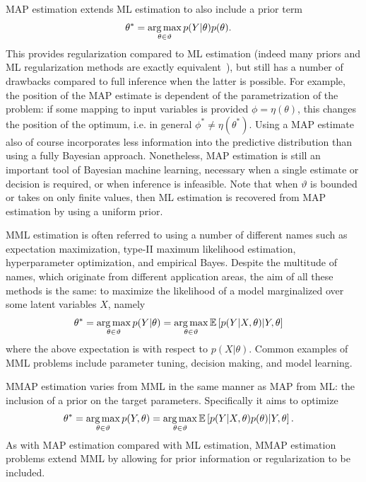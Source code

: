 MAP estimation extends ML estimation to also include a prior term
\begin{align}
\label{eq:opt:map}
\theta^* &= \operatorname*{arg\,max}_{\theta \in \vartheta} p(Y|\theta) p(\theta).	
\end{align}
This provides regularization compared to ML estimation (indeed many priors and
ML regularization methods are exactly equivalent~\cite{bishop2006pattern}),
but still has a number of drawbacks compared to full inference when the latter is
possible.  For example, the position of the MAP estimate is dependent of the
parametrization of the problem: if some mapping to input variables is
provided $\phi = \eta (\theta)$, this changes the position of the optimum, i.e.
in general $\phi^* \neq \eta (\theta^*)$.  Using a MAP estimate also of course
incorporates less information into the predictive distribution than using a
fully Bayesian approach.  Nonetheless, MAP estimation is still an important
tool of Bayesian machine learning, necessary when a single estimate or decision is required,
or when inference is infeasible.  Note that when $\vartheta$ is bounded or takes
on only finite values, then ML estimation is recovered from MAP estimation by using
a uniform prior.

MML estimation is often referred to using a number of different names such as expectation
maximization, type-II maximum likelihood estimation, hyperparameter optimization, and
empirical Bayes.  Despite the multitude of names, which originate from different application
areas, the aim of all these methods is the same: to maximize the likelihood of a model
marginalized over some latent variables $X$, namely
\begin{align}
	\label{eq:opt:MML}
	\theta^* &= \operatorname*{arg\,max}_{\theta \in \vartheta} p(Y|\theta) 
	= \operatorname*{arg\,max}_{\theta \in \vartheta} \mathbb{E} \left[p(Y|X,\theta) | Y, \theta\right]
\end{align}
where the above expectation is with respect to $p(X | \theta)$.  Common examples of MML
problems include parameter tuning, decision making, and model learning.

MMAP estimation varies from MML in the same manner as MAP from ML: the inclusion
of a prior on the target parameters.  Specifically it aims to optimize
\begin{align}
\label{eq:opt:MMAP}
\theta^* &= \operatorname*{arg\,max}_{\theta \in \vartheta} p(Y,\theta) 
= \operatorname*{arg\,max}_{\theta \in \vartheta} \mathbb{E} \left[p(Y|X,\theta) p(\theta) | Y, \theta\right].
\end{align}
As with MAP estimation compared with ML estimation, 
MMAP estimation problems extend MML by allowing for prior information or regularization to be
included.

